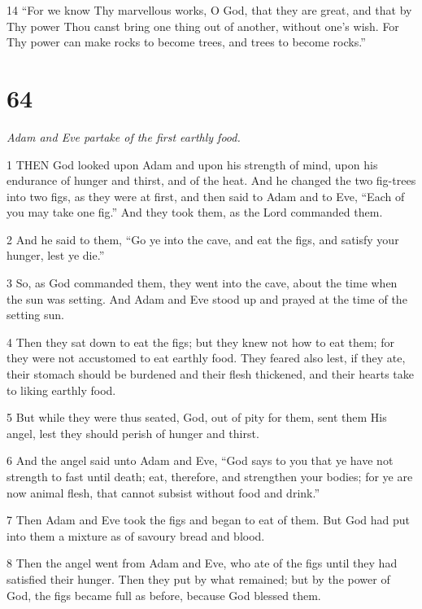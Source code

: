 \par 14 “For we know Thy marvellous works, O God, that they are great, and that by Thy power Thou canst bring one thing out of another, without one's wish. For Thy power can make rocks to become trees, and trees to become rocks.”

\chapter{64}

\par \textit{Adam and Eve partake of the first earthly food.}

\par 1 THEN God looked upon Adam and upon his strength of mind, upon his endurance of hunger and thirst, and of the heat. And he changed the two fig-trees into two figs, as they were at first, and then said to Adam and to Eve, “Each of you may take one fig.” And they took them, as the Lord commanded them.

\par 2 And he said to them, “Go ye into the cave, and eat the figs, and satisfy your hunger, lest ye die.”

\par 3 So, as God commanded them, they went into the cave, about the time when the sun was setting. And Adam and Eve stood up and prayed at the time of the setting sun.

\par 4 Then they sat down to eat the figs; but they knew not how to eat them; for they were not accustomed to eat earthly food. They feared also lest, if they ate, their stomach should be burdened and their flesh thickened, and their hearts take to liking earthly food.

\par 5 But while they were thus seated, God, out of pity for them, sent them His angel, lest they should perish of hunger and thirst.

\par 6 And the angel said unto Adam and Eve, “God says to you that ye have not strength to fast until death; eat, therefore, and strengthen your bodies; for ye are now animal flesh, that cannot subsist without food and drink.”

\par 7 Then Adam and Eve took the figs and began to eat of them. But God had put into them a mixture as of savoury bread and blood.

\par 8 Then the angel went from Adam and Eve, who ate of the figs until they had satisfied their hunger. Then they put by what remained; but by the power of God, the figs became full as before, because God blessed them.

